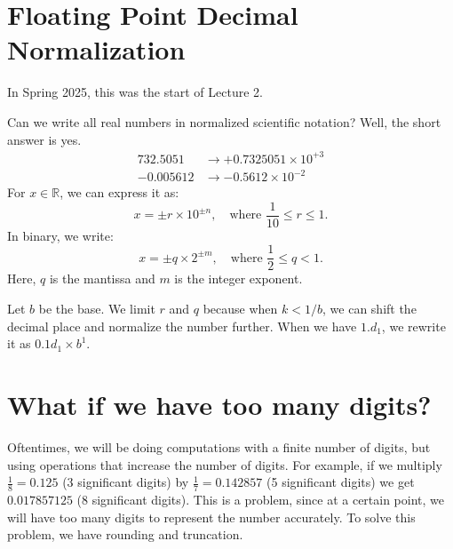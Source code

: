 \newpage
\section{Floating Point Decimal Normalization}
\begin{greenquote}
  In Spring 2025, this was the start of Lecture 2.
\end{greenquote}

Can we write all real numbers in normalized scientific notation? Well, the short
answer is yes.
\begin{align*}
    732.5051 &\rightarrow +0.7325051 \times 10^{+3} \\
    -0.005612 &\rightarrow -0.5612 \times 10^{-2}
\end{align*}
For $x \in \mathbb{R}$, we can express it as:
\begin{equation*}
    x = \pm r \times 10^{\pm n}, \quad \text{where } \frac{1}{10} \leq r \leq 1.
\end{equation*}
In binary, we write:
\begin{equation*}
  x = \pm q \times 2^{\pm m}, \quad \text{where } \frac{1}{2} \leq q < 1.
\end{equation*}
Here, $q$ is the mantissa and $m$ is the integer exponent.

Let $b$ be the base.
We limit $r$ and $q$ because when $k < 1/b$, we can shift the decimal 
place and normalize the number further. When we have $1.d_1$, we rewrite it 
as $0.1d_1 \times b^1$.

\section{What if we have too many digits?}
Oftentimes, we will be doing computations with a finite number of digits, but
using operations that increase the number of digits. For example, if we multiply 
$\frac{1}{8} = 0.125$ (3 significant digits) by $\frac{1}{7} = 0.142857$ (5
significant digits) we get $0.017857125$ (8 significant digits). This is
a problem, since at a certain point, we will have too many digits to represent
the number accurately. To solve this problem, we have rounding and truncation.

